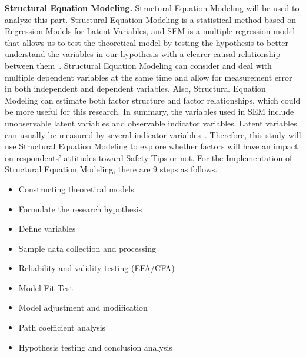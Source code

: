 \textbf{Structural Equation Modeling.} Structural Equation Modeling will be used to analyze this part. Structural Equation Modeling is a statistical method based on Regression Models for Latent Variables, and SEM is a multiple regression model that allows us to test the theoretical model by testing the hypothesis to better understand the variables in our hypothesis with a clearer causal relationship between them~\cite{ref13}. Structural Equation Modeling can consider and deal with multiple dependent variables at the same time and allow for measurement error in both independent and dependent variables. Also, Structural Equation Modeling can estimate both factor structure and factor relationships, which could be more useful for this research. In summary, the variables used in SEM include unobservable latent variables and observable indicator variables. Latent variables can usually be measured by several indicator variables~\cite{ref14}. Therefore, this study will use Structural Equation Modeling to explore whether factors will have an impact on respondents' attitudes toward Safety Tips or not. For the Implementation of Structural Equation Modeling, there are 9 steps as follows. 

\begin{itemize}
\item Constructing theoretical models
\item Formulate the research hypothesis
\item Define variables
\item Sample data collection and processing
\item Reliability and validity testing (EFA/CFA)
\item Model Fit Test
\item Model adjustment and modification
\item Path coefficient analysis
\item Hypothesis testing and conclusion analysis
\end{itemize}

